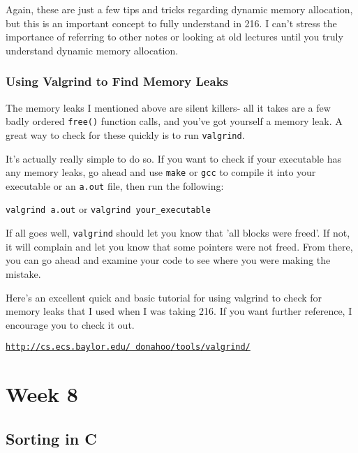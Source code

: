\documentclass[english, 10pt]{article}
\begin{document}
Again, these are just a few tips and tricks regarding dynamic memory allocation, but this is an important concept to fully understand in 216. I can't stress the importance of referring to other notes or looking at old lectures until you truly understand dynamic memory allocation.\newline

\subsubsection{Using Valgrind to Find Memory Leaks}

The memory leaks I mentioned above are silent killers- all it takes are a few badly ordered \texttt{free()} function calls, and you've got yourself a memory leak. A great way to check for these quickly is to run \texttt{valgrind}.\newline

It's actually really simple to do so. If you want to check if your executable has any memory leaks, go ahead and use \texttt{make} or \texttt{gcc} to compile it into your executable or an \texttt{a.out} file, then run the following:\newline

\texttt{valgrind a.out} or \texttt{valgrind your\_executable}\newline

If all goes well, \texttt{valgrind} should let you know that 'all blocks were freed'. If not, it will complain and let you know that some pointers were not freed. From there, you can go ahead and examine your code to see where you were making the mistake.\newline

Here's an excellent quick and basic tutorial for using valgrind to check for memory leaks that I used when I was taking 216. If you want further reference, I encourage you to check it out.\newline

\texttt{\href{http://cs.ecs.baylor.edu/~donahoo/tools/valgrind/}{http://cs.ecs.baylor.edu/~donahoo/tools/valgrind/}}

\section{Week 8}

\subsection{Sorting in C}
\end{document}
